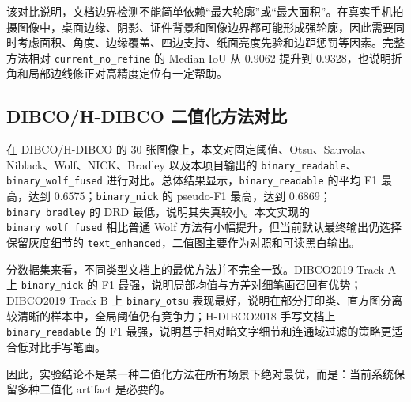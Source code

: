 \documentclass[letterpaper]{article}
\newenvironment{coursewidetable}[2][!tbp]{%
\begin{table}[#1]
\centering
\small
\caption{#2}
\vspace{0.25em}
}{%
\end{table}
}
\begin{document}
该对比说明，文档边界检测不能简单依赖“最大轮廓”或“最大面积”。在真实手机拍摄图像中，桌面边缘、阴影、证件背景和图像边界都可能形成强轮廓，因此需要同时考虑面积、角度、边缘覆盖、四边支持、纸面亮度先验和边距惩罚等因素。完整方法相对 \texttt{current\_no\_refine} 的 Median IoU 从 0.9062 提升到 0.9328，也说明折角和局部边线修正对高精度定位有一定帮助。

\subsection{DIBCO/H-DIBCO 二值化方法对比}

在 DIBCO/H-DIBCO 的 30 张图像上，本文对固定阈值、Otsu、Sauvola、Niblack、Wolf、NICK、Bradley 以及本项目输出的 \texttt{binary\_readable}、\texttt{binary\_wolf\_fused} 进行对比。总体结果显示，\texttt{binary\_readable} 的平均 F1 最高，达到 0.6575；\texttt{binary\_nick} 的 pseudo-F1 最高，达到 0.6869；\texttt{binary\_bradley} 的 DRD 最低，说明其失真较小。本文实现的 \texttt{binary\_wolf\_fused} 相比普通 Wolf 方法有小幅提升，但当前默认最终输出仍选择保留灰度细节的 \texttt{text\_enhanced}，二值图主要作为对照和可读黑白输出。

分数据集来看，不同类型文档上的最优方法并不完全一致。DIBCO2019 Track A 上 \texttt{binary\_nick} 的 F1 最强，说明局部均值与方差对细笔画召回有优势；DIBCO2019 Track B 上 \texttt{binary\_otsu} 表现最好，说明在部分打印类、直方图分离较清晰的样本中，全局阈值仍有竞争力；H-DIBCO2018 手写文档上 \texttt{binary\_readable} 的 F1 最强，说明基于相对暗文字细节和连通域过滤的策略更适合低对比手写笔画。

因此，实验结论不是某一种二值化方法在所有场景下绝对最优，而是：当前系统保留多种二值化 artifact 是必要的。

\begin{coursewidetable}{DIBCO/H-DIBCO 二值化方法对比}
\small
{}
\end{coursewidetable}
\end{document}
